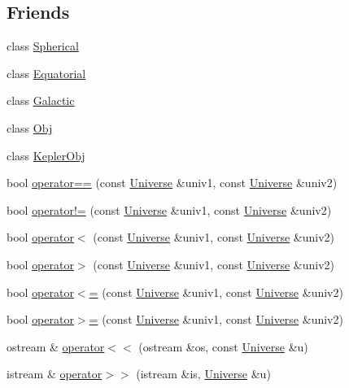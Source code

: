 \subsection*{Friends}
\begin{DoxyCompactItemize}
\item 
class \hyperlink{class_universe_acb9341c7022366ea58f9779acad08e11}{Spherical}
\item 
class \hyperlink{class_universe_a0480ccbf91fcb415696ba466a7ae1401}{Equatorial}
\item 
class \hyperlink{class_universe_a2ba8175dcf9e583c18ffef6d19ee6e9d}{Galactic}
\item 
class \hyperlink{class_universe_a438b315afa8c872673a2dc740ac8243d}{Obj}
\item 
class \hyperlink{class_universe_ab594011d9eb73ce33234ae0e11850252}{Kepler\-Obj}
\item 
bool \hyperlink{class_universe_ad7426db61680a1aa7bf601a316f50296}{operator==} (const \hyperlink{class_universe}{Universe} \&univ1, const \hyperlink{class_universe}{Universe} \&univ2)
\item 
bool \hyperlink{class_universe_a923ffb102f2f1cf8c018e2fdab71e759}{operator!=} (const \hyperlink{class_universe}{Universe} \&univ1, const \hyperlink{class_universe}{Universe} \&univ2)
\item 
bool \hyperlink{class_universe_ae6d5ff462dc8f2a42c1c89dfbb045a70}{operator$<$} (const \hyperlink{class_universe}{Universe} \&univ1, const \hyperlink{class_universe}{Universe} \&univ2)
\item 
bool \hyperlink{class_universe_ac646834ee273250d89054f51c560ad90}{operator$>$} (const \hyperlink{class_universe}{Universe} \&univ1, const \hyperlink{class_universe}{Universe} \&univ2)
\item 
bool \hyperlink{class_universe_aedb45560ee22b1f0d1913bd40c716f3e}{operator$<$=} (const \hyperlink{class_universe}{Universe} \&univ1, const \hyperlink{class_universe}{Universe} \&univ2)
\item 
bool \hyperlink{class_universe_ad2f27b03dcb666cb1e5f00840f3cffe2}{operator$>$=} (const \hyperlink{class_universe}{Universe} \&univ1, const \hyperlink{class_universe}{Universe} \&univ2)
\item 
ostream \& \hyperlink{class_universe_af3dca6b540cbad8426d8aae6dc1f6f32}{operator$<$$<$} (ostream \&os, const \hyperlink{class_universe}{Universe} \&u)
\item 
istream \& \hyperlink{class_universe_ad347ea8dc2c56d9d77d9c6f673d5927e}{operator$>$$>$} (istream \&is, \hyperlink{class_universe}{Universe} \&u)
\end{DoxyCompactItemize}


